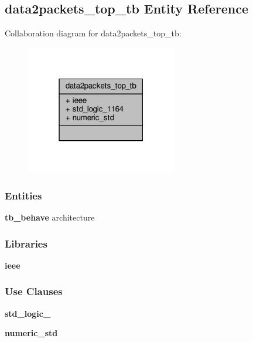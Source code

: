\subsection{data2packets\+\_\+top\+\_\+tb Entity Reference}
\label{classdata2packets__top__tb}


Collaboration diagram for data2packets\+\_\+top\+\_\+tb\+:\nopagebreak
\begin{figure}[H]
\begin{center}
\leavevmode
\includegraphics[width=187pt]{d2/dca/classdata2packets__top__tb__coll__graph}
\end{center}
\end{figure}
\subsubsection*{Entities}
\begin{DoxyCompactItemize}
\item 
{\bf tb\+\_\+behave} architecture
\end{DoxyCompactItemize}
\subsubsection*{Libraries}
 \begin{DoxyCompactItemize}
\item 
{\bf ieee} 
\end{DoxyCompactItemize}
\subsubsection*{Use Clauses}
 \begin{DoxyCompactItemize}
\item 
{\bf std\+\_\+logic\+\_}   
\item 
{\bf numeric\+\_\+std}   
\end{DoxyCompactItemize}


